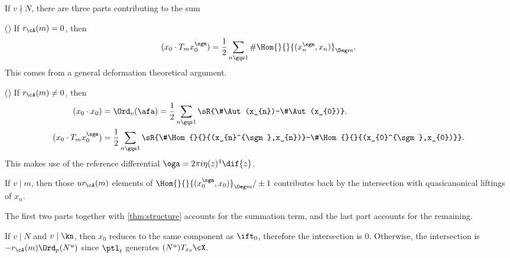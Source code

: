 \documentclass[a4paper, twoside]{article}
\begin{document}
\begin{prf}
	If $v\nmid N$, there are three parts contributing to the sum
	\begin{enr}
		\item (\cite[III.4.4]{GZ1986}) If $r_{\cA}(m)=0$, then
		\[
			(x_{0}\cdot T_{m}x_{0}^{\sgm})=\frac{1}{2}\sum_{n\gqs1}\#\Hom{}{}{(x_{n}^{\sgm},x_{n})}_{\Deg m}.
		\]
		This comes from a general deformation theoretical argument.
		\item (\cite[III.8.2]{GZ1986}) If $r_{\cA}(m)\neq0$, then
		\begin{align*}
		  (x_{0}\cdot x_{0})&=\Ord_{v}(\afa)=\frac{1}{2}\sum_{n\gqs1}\sR{\#\Aut(x_{n})-\#\Aut(x_{0})}.\\
		  (x_{0}\cdot T_{m}x_{0}^{\sgm})&=\frac{1}{2}\sum_{n\gqs1}\sR{\#\Hom{}{}{(x_{n}^{\sgm},x_{n})}-\#\Hom{}{}{(x_{0}^{\sgm},x_{0})}}.
		\end{align*}
		This makes use of the reference differential $\oga=2\pi i\eta(z)^{4}\dif{z}$.
		\item If $v\mid m$, then those $ur_{\cA}(m)$ elements of $\Hom{}{}{(x_{0}^{\sgm},x_{0})}_{\Deg m}/\pm1$ contributes back by the intersection with quasicanonical liftings of $x_{n}$.
	\end{enr}
	The first two parts together with \cref{thm:structure} accounts for the summation term, and the last part accounts for the remaining.

	If $v\mid N$ and $v\mid \kn$, then $x_{0}$ reduces to the same component as $\ift_{0}$, therefore the intersection is $0$. Otherwise, the intersection is $-r_{\cA}(m)\Ord_{p}(N^{u})$ since $\ptl_{t}$ generates $(N^{u})T_{x_{0}}\cX$.
\end{prf}





\printref
\end{document}
